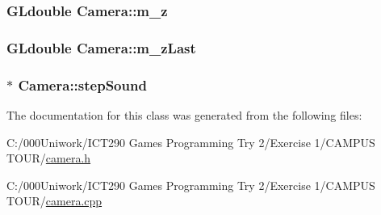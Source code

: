 \subsubsection[{\texorpdfstring{m\+\_\+z}{m_z}}]{\setlength{\rightskip}{0pt plus 5cm}G\+Ldouble Camera\+::m\+\_\+z\hspace{0.3cm}{\ttfamily [private]}}\hypertarget{class_camera_a34fa5e648d04f0648e397ea7bde2d717}{}\label{class_camera_a34fa5e648d04f0648e397ea7bde2d717}
\subsubsection[{\texorpdfstring{m\+\_\+z\+Last}{m_zLast}}]{\setlength{\rightskip}{0pt plus 5cm}G\+Ldouble Camera\+::m\+\_\+z\+Last\hspace{0.3cm}{\ttfamily [private]}}\hypertarget{class_camera_ae08110e1bfe81d6f019924c0e67f3373}{}\label{class_camera_ae08110e1bfe81d6f019924c0e67f3373}
\subsubsection[{\texorpdfstring{step\+Sound}{stepSound}}]{$\ast$ Camera\+::step\+Sound\hspace{0.3cm}{\ttfamily [private]}}\hypertarget{class_camera_af49515a2c895ccb07b3a7ba8644b9cc3}{}\label{class_camera_af49515a2c895ccb07b3a7ba8644b9cc3}


The documentation for this class was generated from the following files\+:\begin{DoxyCompactItemize}
\item 
C\+:/000\+Uniwork/\+I\+C\+T290 Games Programming Try 2/\+Exercise 1/\+C\+A\+M\+P\+U\+S T\+O\+U\+R/\hyperlink{camera_8h}{camera.\+h}\item 
C\+:/000\+Uniwork/\+I\+C\+T290 Games Programming Try 2/\+Exercise 1/\+C\+A\+M\+P\+U\+S T\+O\+U\+R/\hyperlink{camera_8cpp}{camera.\+cpp}\end{DoxyCompactItemize}
